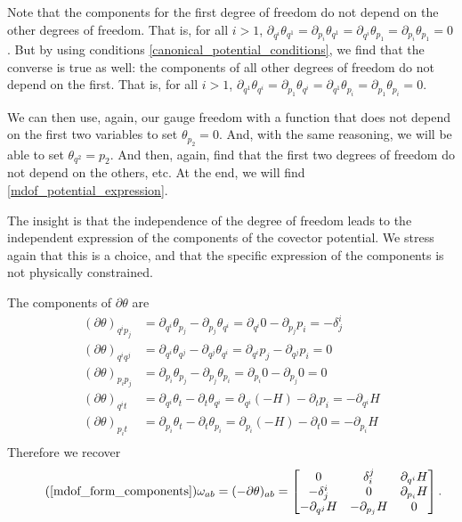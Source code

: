 \documentclass[10pt,twocolumn, nofootinbib]{revtex4-2}
\begin{document}
Note that the components for the first degree of freedom do not depend on the other degrees of freedom. That is, for all $i>1$, $\partial_{q^i} \theta_{q^1} = \partial_{p_i} \theta_{q^1} = \partial_{q^i} \theta_{p_1} = \partial_{p_i} \theta_{p_1} = 0$. But by using conditions \ref{canonical_potential_conditions}, we find that the converse is true as well: the components of all other degrees of freedom do not depend on the first. That is, for all $i>1$, $\partial_{q^1} \theta_{q^i} = \partial_{p_1} \theta_{q^i} = \partial_{q^1} \theta_{p_i} = \partial_{p_1} \theta_{p_i} = 0$.

We can then use, again, our gauge freedom with a function that does not depend on the first two variables to set $\theta_{p_2} = 0$. And, with the same reasoning, we will be able to set $\theta_{q^2} = p_2$. And then, again, find that the first two degrees of freedom do not depend on the others, etc. At the end, we will find \ref{mdof_potential_expression}.

The insight is that the independence of the degree of freedom leads to the independent expression of the components of the covector potential. We stress again that this is a choice, and that the specific expression of the components is not physically constrained.

The components of $\partial\theta$ are
\begin{equation}
	\begin{aligned}
		(\partial\theta)_{q^i p_j} &= \partial_{q^i}\theta_{p_j} - \partial_{p_j}\theta_{q^i} = \partial_{q^i} 0 - \partial_{p_j} p_i= - \delta^i_j \\
		(\partial\theta)_{q^i q^j} &= \partial_{q^i}\theta_{q^j} - \partial_{q^j}\theta_{q^i} = \partial_{q^i}p_j - \partial_{q^j}p_i = 0 \\
		(\partial\theta)_{p_i p_j} &= \partial_{p_i}\theta_{p_j} - \partial_{p_j}\theta_{p_i} = \partial_{p_i} 0 - \partial_{p_j} 0 = 0 \\
		(\partial\theta)_{q^i t} &= \partial_{q^i}\theta_{t} - \partial_{t}\theta_{q^i} = \partial_{q^i} (-H) - \partial_{t} p_i= - \partial_{q^i} H \\
		(\partial\theta)_{p_i t} &= \partial_{p_i}\theta_{t} - \partial_{t}\theta_{p_i} = \partial_{p_i} (-H) - \partial_{t} 0= - \partial_{p_i} H \\
	\end{aligned}
\end{equation}
Therefore we recover
\begin{equation}
	\tag*{(\ref{mdof_form_components})}
	\omega_{ab}=(-\partial\theta)_{ab} = \begin{bmatrix}
		0 & \delta^j_i & \partial_{q^i} H \\
		-\delta^i_j & 0 & \partial_{p_i} H \\
		- \partial_{q^j} H & - \partial_{p_j} H & 0
	\end{bmatrix}.
\end{equation}
\end{document}
